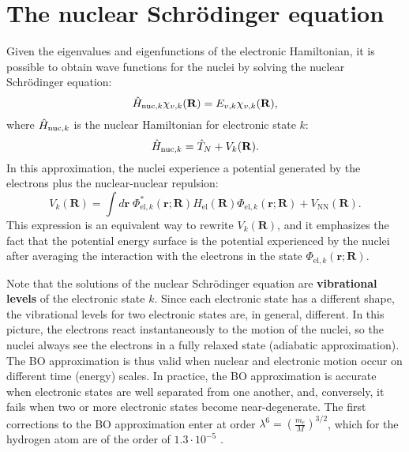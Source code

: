 \documentclass[../Main/chem532-notes.tex]{subfiles}
\begin{document}
\section{The nuclear Schr\"{o}dinger equation}
Given the eigenvalues and eigenfunctions of the electronic Hamiltonian, it is possible to obtain wave functions for the nuclei by solving the nuclear Schr\"{o}dinger equation:
\begin{equation}
\hat{H}_{{\rm nuc},k} \chi_{v,k}(\mathbf{R}) =  E_{v,k} \chi_{v,k}(\mathbf{R}),
\end{equation}
where $\hat{H}_{{\rm nuc},k}$ is the nuclear Hamiltonian for electronic state $k$:
\begin{equation}
\hat{H}_{{\rm nuc},k} = \hat{T}_{N} + V_{k}(\mathbf{R}).
\end{equation}
In this approximation, the nuclei experience a potential generated by the electrons plus the nuclear-nuclear repulsion:
\begin{equation}
V_{k}(\mathbf{R}) = \int d\mathbf{r} \; \Phi^*_{\mathrm{el},k} (\mathbf{r};\mathbf{R}) \hat{H}_\mathrm{el}(\mathbf{R}) \Phi_{\mathrm{el},k} (\mathbf{r};\mathbf{R}) + V_\mathrm{NN}(\mathbf{R}).
\end{equation}
This expression is an equivalent way to rewrite $V_{k}(\mathbf{R}) $, and it emphasizes the fact that the potential energy surface is the potential experienced by the nuclei after averaging the interaction with the electrons in the state $\Phi_{\mathrm{el},k} (\mathbf{r};\mathbf{R})$.

Note that the solutions of the nuclear Schr\"{o}dinger equation are \textbf{vibrational levels} of the electronic state $k$.
Since each electronic state has a different shape, the vibrational levels for two electronic states are, in general, different.
In this picture, the electrons react instantaneously to the motion of the nuclei, so the nuclei always see the electrons in a fully relaxed state (adiabatic approximation).
The BO approximation is thus valid when nuclear and electronic motion occur on different time (energy) scales. In practice, the BO approximation is accurate when electronic states are well separated from one another, and, conversely, it fails when two or more electronic states become near-degenerate.
The first corrections to the BO approximation enter at order $\lambda^6 = \left( \frac{m_e}{M} \right)^{3/2}$, which for the hydrogen atom are of the order of $1.3 \cdot 10^{-5}$ \Eh.
\end{document}

